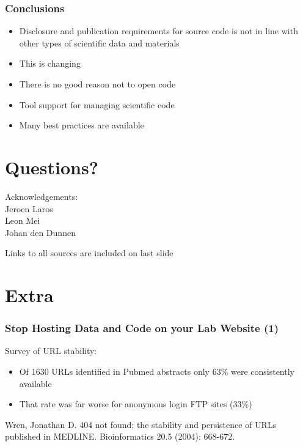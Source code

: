 \documentclass[slidestop]{beamer}
\begin{document}
\begin{frame}
  \frametitle{Conclusions}
  \begin{itemize}
    \item Disclosure and publication requirements for source code is not in
      line with other types of scientific data and materials
    \item This is changing
    \item There is no good reason not to open code
    \item Tool support for managing scientific code
    \item Many best practices are available
  \end{itemize}
\end{frame}

\section*{Questions?}
\lastpagetemplate
\begin{frame}
  \begin{center}
    Acknowledgements:\\
    \vspace{0.8cm}
    Jeroen Laros\\
    Leon Mei\\
    Johan den Dunnen
  \end{center}
  \vspace{1cm}
  {\tiny
    Links to all sources are included on last slide
  }
\end{frame}

\section*{Extra}

\extrapagetemplate
\begin{frame}
  \frametitle{Stop Hosting Data and Code on your Lab Website (1)}
  Survey of URL stability:
  \begin{itemize}
    \item Of 1630 URLs identified in Pubmed abstracts only 63\% were
      consistently available
    \item That rate was far worse for anonymous login FTP sites (33\%)
  \end{itemize}
  Wren, Jonathan D. 404 not found: the stability and persistence of URLs
  published in MEDLINE. Bioinformatics 20.5 (2004): 668-672.
\end{frame}
\end{document}
